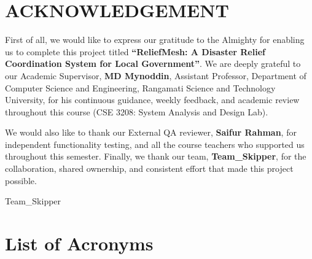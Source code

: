 \documentclass[11pt,a4paper]{report}
\newcommand{\thesistitle}{ReliefMesh: A Disaster Relief Coordination System for Local Government}
\begin{document}
\chapter*{ACKNOWLEDGEMENT}
\thispagestyle{empty}

First of all, we would like to express our gratitude to the Almighty for enabling us to complete this project titled \textbf{``\thesistitle''}. We are deeply grateful to our Academic Supervisor, \textbf{MD Mynoddin}, Assistant Professor, Department of Computer Science and Engineering, Rangamati Science and Technology University, for his continuous guidance, weekly feedback, and academic review throughout this course (CSE 3208: System Analysis and Design Lab).

We would also like to thank our External QA reviewer, \textbf{Saifur Rahman}, for independent functionality testing, and all the course teachers who supported us throughout this semester. Finally, we thank our team, \textbf{Team\_Skipper}, for the collaboration, shared ownership, and consistent effort that made this project possible.

\vspace{1cm}
\hfill Team\_Skipper
\clearpage

\pagestyle{frontmatter}
\setcounter{page}{2}

\tableofcontents
\newpage

\listoftables
{}
\newpage

\listoffigures
{}
\newpage

\chapter*{List of Acronyms}
\end{document}
